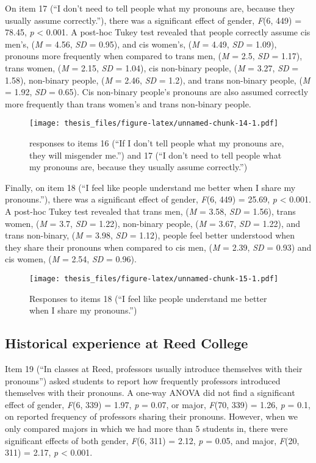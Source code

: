 \documentclass[12pt,twoside]{reedthesis}
\begin{document}
On item 17 (``I don't need to tell people what my pronouns are, because they usually assume correctly.''), there was a significant effect of gender, \emph{F}(6, 449) = 78.45, \emph{p} \textless{} 0.001. A post-hoc Tukey test revealed that people correctly assume cis men's, (\emph{M} = 4.56, \emph{SD} = 0.95), and cis women's, (\emph{M} = 4.49, \emph{SD} = 1.09), pronouns more frequently when compared to trans men, (\emph{M} = 2.5, \emph{SD} = 1.17), trans women, (\emph{M} = 2.15, \emph{SD} = 1.04), cis non-binary people, (\emph{M} = 3.27, \emph{SD} = 1.58), non-binary people, (\emph{M} = 2.46, \emph{SD} = 1.2), and trans non-binary people, (\emph{M} = 1.92, \emph{SD} = 0.65). Cis non-binary people's pronouns are also assumed correctly more frequently than trans women's and trans non-binary people.
\begin{figure}
\centering
\texttt{[image: thesis\_files/figure-latex/unnamed-chunk-14-1.pdf]}
\caption{\label{fig:unnamed-chunk-14}responses to items 16 (``If I don't tell people what my pronouns are, they will misgender me.'') and 17 (``I don't need to tell people what my pronouns are, because they usually assume correctly.'')}
\end{figure}
Finally, on item 18 (``I feel like people understand me better when I share my pronouns.''), there was a significant effect of gender, \emph{F}(6, 449) = 25.69, \emph{p} \textless{} 0.001. A post-hoc Tukey test revealed that trans men, (\emph{M} = 3.58, \emph{SD} = 1.56), trans women, (\emph{M} = 3.7, \emph{SD} = 1.22), non-binary people, (\emph{M} = 3.67, \emph{SD} = 1.22), and trans non-binary, (\emph{M} = 3.98, \emph{SD} = 1.12), people feel better understood when they share their pronouns when compared to cis men, (\emph{M} = 2.39, \emph{SD} = 0.93) and cis women, (\emph{M} = 2.54, \emph{SD} = 0.96).
\begin{figure}
\centering
\texttt{[image: thesis\_files/figure-latex/unnamed-chunk-15-1.pdf]}
\caption{\label{fig:unnamed-chunk-15}Responses to items 18 (``I feel like people understand me better when I share my pronouns.'')}
\end{figure}
\hypertarget{historical-experience-at-reed-college}{%
\subsection{Historical experience at Reed College}\label{historical-experience-at-reed-college}}

Item 19 (``In classes at Reed, professors usually introduce themselves with their pronouns'') asked students to report how frequently professors introduced themselves with their pronouns. A one-way ANOVA did not find a significant effect of gender, \emph{F}(6, 339) = 1.97, \emph{p} = 0.07, or major, \emph{F}(70, 339) = 1.26, \emph{p} = 0.1, on reported frequency of professors sharing their pronouns. However, when we only compared majors in which we had more than 5 students in, there were significant effects of both gender, \emph{F}(6, 311) = 2.12, \emph{p} = 0.05, and major, \emph{F}(20, 311) = 2.17, \emph{p} \textless{} 0.001.
\end{document}

